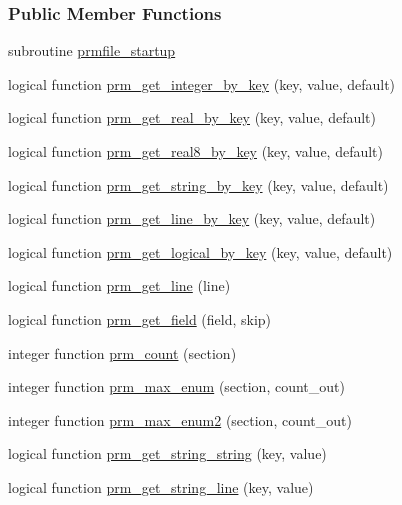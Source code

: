 \subsubsection*{Public Member Functions}
\begin{DoxyCompactItemize}
\item 
subroutine \hyperlink{classprmfile_a3346e9d737d3d72dc666fd3627222440}{prmfile\-\_\-startup}
\item 
logical function \hyperlink{classprmfile_a75844b849bdcabee3c914364c5749a6e}{prm\-\_\-get\-\_\-integer\-\_\-by\-\_\-key} (key, value, default)
\item 
logical function \hyperlink{classprmfile_a4f6f6a83a9395420264bb691709c9aee}{prm\-\_\-get\-\_\-real\-\_\-by\-\_\-key} (key, value, default)
\item 
logical function \hyperlink{classprmfile_a349ea1c346ea747aa147b4e04cd3ed54}{prm\-\_\-get\-\_\-real8\-\_\-by\-\_\-key} (key, value, default)
\item 
logical function \hyperlink{classprmfile_ad25ff6cce56fff86eef62e6b7e724fc2}{prm\-\_\-get\-\_\-string\-\_\-by\-\_\-key} (key, value, default)
\item 
logical function \hyperlink{classprmfile_a9f57278762b2a7b38ce2e1ec0d13e10e}{prm\-\_\-get\-\_\-line\-\_\-by\-\_\-key} (key, value, default)
\item 
logical function \hyperlink{classprmfile_ab4e68bd87b05047488e4955bf1987e49}{prm\-\_\-get\-\_\-logical\-\_\-by\-\_\-key} (key, value, default)
\item 
logical function \hyperlink{classprmfile_a36840b95034f748e9cd891b86649f690}{prm\-\_\-get\-\_\-line} (line)
\item 
logical function \hyperlink{classprmfile_a6987d9ccc6f7930ccb96c2c871a7ad35}{prm\-\_\-get\-\_\-field} (field, skip)
\item 
integer function \hyperlink{classprmfile_a2bc210de47b568a5647b46ae9931acf3}{prm\-\_\-count} (section)
\item 
integer function \hyperlink{classprmfile_a55637c6b964b51c43ac6ace6a0da6d9d}{prm\-\_\-max\-\_\-enum} (section, count\-\_\-out)
\item 
integer function \hyperlink{classprmfile_aa8d0a18173929a68b0b4e5e2c623be86}{prm\-\_\-max\-\_\-enum2} (section, count\-\_\-out)
\item 
logical function \hyperlink{classprmfile_a528818d48715859b36c9ff1541fef09b}{prm\-\_\-get\-\_\-string\-\_\-string} (key, value)
\item 
logical function \hyperlink{classprmfile_ac623648e310be60c8012d0ecd73bfa9c}{prm\-\_\-get\-\_\-string\-\_\-line} (key, value)

\end{DoxyCompactItemize}
